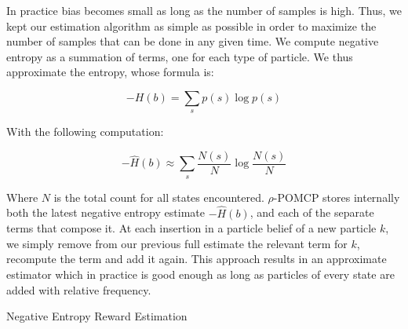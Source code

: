 In practice bias becomes small as long as the number of samples is high. Thus, we kept our
estimation algorithm as simple as possible in order to maximize the number of samples that can be
done in any given time. We compute negative entropy as a summation of terms, one for each type of
particle. We thus approximate the entropy, whose formula is:

\[ -H(b) = \sum_s p(s) \log p(s) \]

With the following computation:

\[ -\hat{H}(b) \approx \sum_s \frac{N(s)}{N} \log \frac{N(s)}{N} \]

Where $N$ is the total count for all states encountered. $\rho$-POMCP stores internally both the
latest negative entropy estimate $-\hat{H}(b)$, and each of the separate terms that compose it. At each
insertion in a particle belief of a new particle $k$, we simply remove from our previous full estimate the
relevant term for $k$, recompute the term and add it again. This approach results in an approximate
estimator which in practice is good enough as long as particles of every state are added with relative frequency.

\begin{algorithm}[H]
    \caption{Negative Entropy Reward Estimation}


\end{algorithm}
%

%

